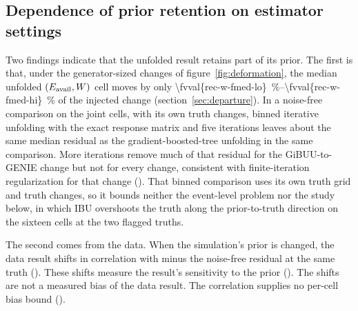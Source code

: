 \subsection{Dependence of prior retention on estimator settings}
\label{sec:prr}

Two findings indicate that the unfolded result retains part of its prior. The first is that, under the generator-sized changes of figure~\ref{fig:deformation}, the median unfolded $(E_{\mathrm{avail}},W)$ cell moves by only \SIrange{\fvval{rec-w-fmed-lo}}{\fvval{rec-w-fmed-hi}}{\percent} of the injected change (section~\ref{sec:departure}). In a noise-free comparison on the joint cells, with its own truth changes, binned iterative unfolding with the exact response matrix and five iterations leaves about the same median residual as the gradient-boosted-tree unfolding in the same comparison. More iterations remove much of that residual for the GiBUU-to-GENIE change but not for every change, consistent with finite-iteration regularization for that change (). That binned comparison uses its own truth grid and truth changes, so it bounds neither the event-level problem nor the study below, in which IBU overshoots the truth along the prior-to-truth direction on the sixteen cells at the two flagged truths.

The second comes from the data. When the simulation's prior is changed, the data result shifts in correlation with minus the noise-free residual at the same truth (). These shifts measure the result's sensitivity to the prior (). The shifts are not a measured bias of the data result. The correlation supplies no per-cell bias bound ().



